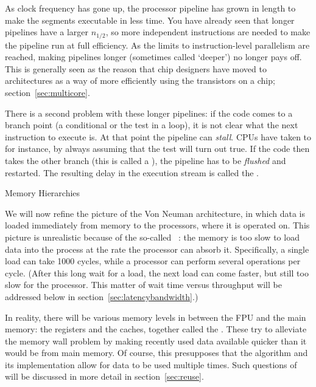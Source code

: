 As clock frequency has gone up, the processor pipeline has grown in
length to make the segments executable in less time. You have already
seen that longer pipelines have a larger $n_{1/2}$, so more
independent instructions are needed to make the pipeline run at full
efficiency. As the limits to instruction-level parallelism are
reached, making pipelines longer (sometimes
called `deeper') no longer pays off. This is
generally seen as the reason that chip designers have moved to
 architectures as a way of more efficiently
using the transistors on a chip; section~\ref{sec:multicore}.

There is a second problem with these longer pipelines: if the code
comes to a branch point (a conditional or the test in a loop), it is
not clear what the next instruction to execute is. At that point the
pipeline can \emph{stall}. \acp{CPU} have taken to
 for instance, by always assuming
that the test will turn out true. If the code then takes the other
branch (this is called a ), the
pipeline has to be \emph{flushed} and
restarted. The resulting delay in the execution stream is called the
.

 {Memory Hierarchies}
\label{sec:hierarchy}

We will now refine the picture of the Von Neuman architecture, in
which data is loaded immediately from memory to the processors, where
it is operated on. This picture is unrealistic because of the
so-called ~\cite{Wulf:memory-wall}: the
memory is too slow to load data into the process at the rate the
processor can absorb it. Specifically, a single load can take 1000
cycles, while a processor can perform several operations per
cycle. (After this long wait for a load, the next load can come
faster, but still too slow for the processor. This matter of wait time
versus throughput will be addressed below in
section~\ref{sec:latencybandwidth}.)

In reality, there will be various memory levels in between the
\ac{FPU} and the main memory: the registers
and the caches, together called the
. These try to alleviate the memory
wall problem by making recently used data available quicker than it
would be from main memory. Of course, this presupposes that the
algorithm and its implementation allow for data to be used multiple
times.  Such questions of  will be discussed in
more detail in section~\ref{sec:reuse}.

